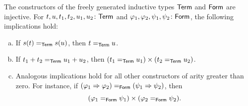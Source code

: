 \begin{thm}
    \label{thm:constructor-injectivity}
    The constructors of the freely generated inductive types\/ $\mathsf{Term}$ and\/ $\mathsf{Form}$ are injective. For\/ $t,u,t_1,t_2,u_1,u_2\colon\fun{Term}$ and\/ $\varphi_1,\varphi_2,\psi_1,\psi_2\colon\fun{Form}$, the following implications hold:
    \begin{enumerate}[a),font=\upshape]
        \item If\/ $s(t)\mathrel{=_{\mathsf{Term}}}s(u)$, then\/ $t\mathrel{=_{\mathsf{Term}}}u$.
        
        \item If\/ $t_1+t_2\mathrel{=_{\mathsf{Term}}}u_1+u_2$, then\/ $(t_1\mathrel{=_{\mathsf{Term}}}u_1)\times(t_2\mathrel{=_{\mathsf{Term}}}u_2)$.
        
        \item Analogous implications hold for all other constructors of arity greater than zero. For instance, if\/ $(\varphi_1\mathrel{\Rightarrow}\varphi_2)\mathrel{=_{\mathsf{Form}}}(\psi_1\mathrel{\Rightarrow}\psi_2)$, then
        \[
            (\varphi_1\mathrel{=_{\mathsf{Form}}}\psi_1)
            \times
            (\varphi_2\mathrel{=_{\mathsf{Form}}}\psi_2).
        \]
    \end{enumerate}
\end{thm}

